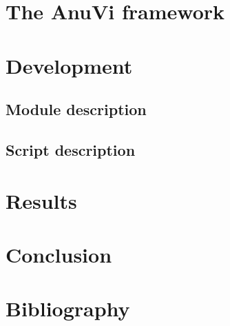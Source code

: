 \documentclass{article}
\begin{document}
\section{The AnuVi framework}
\section{Development}
 \subsection{Module description}
 \subsection{Script description}
\section{Results}
\section{Conclusion}
\section{Bibliography}
\end{document}
